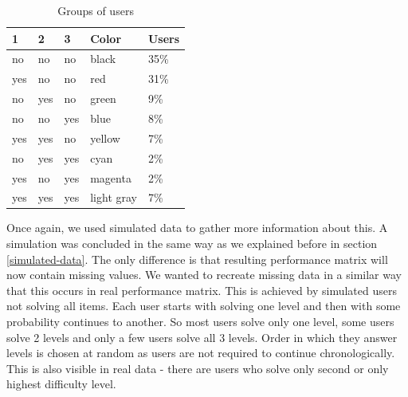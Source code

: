 \documentclass[
  digital, %
  table,   %
  nolof,     %
  nolot,     %
  nocover
]{fithesis3}
\begin{document}
\begin{table}
  \begin{tabular}{ | l | l | l | l | l | }
    \hline
      1   & 2   & 3   & Color      & Users \\ \hline
      no  & no  & no  & black      & 35\%  \\ \hline
      yes & no  & no  & red        & 31\%  \\ \hline
      no  & yes & no  & green      & 9\%   \\ \hline
      no  & no  & yes & blue       & 8\%   \\ \hline
      yes & yes & no  & yellow     & 7\%   \\ \hline
      no  & yes & yes & cyan       & 2\%   \\ \hline
      yes & no  & yes & magenta    & 2\%   \\ \hline
      yes & yes & yes & light gray & 7\%   \\ \hline
    \hline
  \end{tabular}
  \caption{Groups of users}
  \label{tab:user-groups}
\end{table}


Once again, we used simulated data to gather more information about this. A simulation was concluded in the same way as we explained before in section \ref{simulated-data}. The only difference is that resulting performance matrix will now contain missing values. We wanted to recreate missing data in a similar way that this occurs in real performance matrix. This is achieved by simulated users not solving all items. Each user starts with solving one level and then with some probability continues to another. So most users solve only one level, some users solve 2 levels and only a few users solve all 3 levels. Order in which they answer levels is chosen at random as users are not required to continue chronologically. This is also visible in real data - there are users who solve only second or only highest difficulty level.

\end{document}
